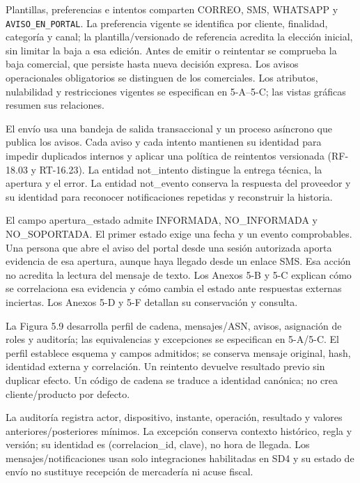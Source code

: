 Plantillas, preferencias e intentos comparten CORREO, SMS, WHATSAPP y \texttt{AVISO\_\allowbreak{}EN\_\allowbreak{}PORTAL}. La preferencia vigente se identifica por cliente, finalidad, categoría y canal; la plantilla/versionado de referencia acredita la elección inicial, sin limitar la baja a esa edición. Antes de emitir o reintentar se comprueba la baja comercial, que persiste hasta nueva decisión expresa. Los avisos operacionales obligatorios se distinguen de los comerciales. Los atributos, nulabilidad y restricciones vigentes se especifican en 5-A–5-C; las vistas gráficas resumen sus relaciones.

El envío usa una bandeja de salida transaccional y un proceso asíncrono que publica los avisos. Cada aviso y cada intento mantienen su identidad para impedir duplicados internos y aplicar una política de reintentos versionada (RF-18.03 y RT-16.23). La entidad not\_intento distingue la entrega técnica, la apertura y el error. La entidad not\_evento conserva la respuesta del proveedor y su identidad para reconocer notificaciones repetidas y reconstruir la historia.

El campo apertura\_estado admite INFORMADA, NO\_INFORMADA y NO\_SOPORTADA. El primer estado exige una fecha y un evento comprobables. Una persona que abre el aviso del portal desde una sesión autorizada aporta evidencia de esa apertura, aunque haya llegado desde un enlace SMS. Esa acción no acredita la lectura del mensaje de texto. Los Anexos 5-B y 5-C explican cómo se correlaciona esa evidencia y cómo cambia el estado ante respuestas externas inciertas. Los Anexos 5-D y 5-F detallan su conservación y consulta.

La Figura 5.9 desarrolla perfil de cadena, mensajes/ASN, avisos, asignación de roles y auditoría; las equivalencias y excepciones se especifican en 5-A/5-C. El perfil establece esquema y campos admitidos; se conserva mensaje original, hash, identidad externa y correlación. Un reintento devuelve resultado previo sin duplicar efecto. Un código de cadena se traduce a identidad canónica; no crea cliente/producto por defecto.

La auditoría registra actor, dispositivo, instante, operación, resultado y valores anteriores/posteriores mínimos. La excepción conserva contexto histórico, regla y versión; su identidad es (correlacion\_id, clave), no hora de llegada. Los mensajes/notificaciones usan solo integraciones habilitadas en SD4 y su estado de envío no sustituye recepción de mercadería ni acuse fiscal.


